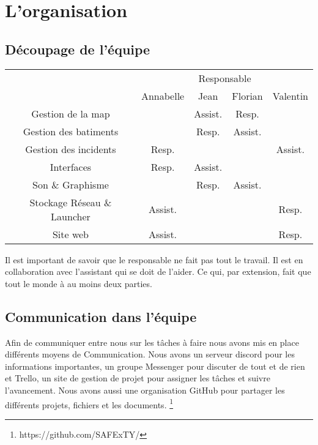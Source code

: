 \section{L'organisation}
\subsection{Découpage de l'équipe}


\begin{table}[h]
\begin{tabular}{c|c|c|c|c|}
\cline{2-5}
                                                  & \multicolumn{4}{c|}{Responsable}         \\ \cline{2-5} 
                                                  & Annabelle & Jean    & Florian & Valentin \\ \hline
\multicolumn{1}{|c|}{Gestion de la map}           &           & Assist. & Resp.   &          \\ \hline
\multicolumn{1}{|c|}{Gestion des batiments}       &           & Resp.   & Assist. &          \\ \hline
\multicolumn{1}{|c|}{Gestion des incidents}       & Resp.     &         &         & Assist.  \\ \hline
\multicolumn{1}{|c|}{Interfaces}                  & Resp.     & Assist. &         &          \\ \hline
\multicolumn{1}{|c|}{Son \& Graphisme}            &           & Resp.   & Assist. &          \\ \hline
\multicolumn{1}{|c|}{Stockage Réseau \& Launcher} & Assist.   &         &         & Resp.    \\ \hline
\multicolumn{1}{|c|}{Site web}                    & Assist.   &         &         & Resp.    \\ \hline
\end{tabular}
\end{table}

Il est important de savoir que le responsable ne fait pas tout le travail. Il est en collaboration avec l'assistant qui se doit de l'aider. Ce qui, par extension, fait que tout le monde à au moins deux parties.

\subsection{Communication dans l'équipe}
Afin de communiquer entre nous sur les tâches à faire nous avons mis en place différents moyens de Communication. Nous avons un serveur discord pour les informations importantes, un groupe Messenger pour discuter de tout et de rien et Trello, un site de gestion de projet pour assigner les tâches et suivre l'avancement. Nous avons aussi une organisation GitHub pour partager les différents projets, fichiers et les documents. \footnote{https://github.com/SAFExTY/}

